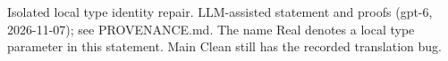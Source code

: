 \documentclass[11pt]{article}
\begin{document}

\bigskip
{\footnotesize Isolated local type identity repair. LLM-assisted statement and
proofs (gpt-6, 2026-11-07); see PROVENANCE.md. The name Real denotes a local type
parameter in this statement. Main Clean still has the recorded translation bug.}
\end{document}
